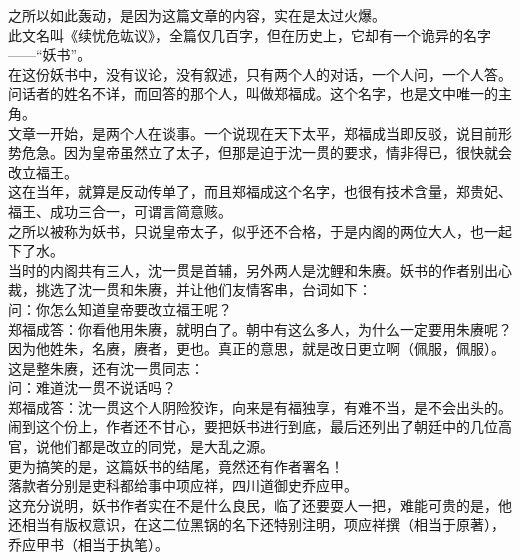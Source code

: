 \begin{multicols}{\theparacolNo}
之所以如此轰动，是因为这篇文章的内容，实在是太过火爆。\\

此文名叫《续忧危竑议》，全篇仅几百字，但在历史上，它却有一个诡异的名字——“妖书”。\\

在这份妖书中，没有议论，没有叙述，只有两个人的对话，一个人问，一个人答。问话者的姓名不详，而回答的那个人，叫做郑福成。这个名字，也是文中唯一的主角。\\

文章一开始，是两个人在谈事。一个说现在天下太平，郑福成当即反驳，说目前形势危急。因为皇帝虽然立了太子，但那是迫于沈一贯的要求，情非得已，很快就会改立福王。\\

这在当年，就算是反动传单了，而且郑福成这个名字，也很有技术含量，郑贵妃、福王、成功三合一，可谓言简意赅。\\

之所以被称为妖书，只说皇帝太子，似乎还不合格，于是内阁的两位大人，也一起下了水。\\

当时的内阁共有三人，沈一贯是首辅，另外两人是沈鲤和朱赓。妖书的作者别出心裁，挑选了沈一贯和朱赓，并让他们友情客串，台词如下：\\

问：你怎么知道皇帝要改立福王呢？\\

郑福成答：你看他用朱赓，就明白了。朝中有这么多人，为什么一定要用朱赓呢？因为他姓朱，名赓，赓者，更也。真正的意思，就是改日更立啊（佩服，佩服）。\\

这是整朱赓，还有沈一贯同志：\\

问：难道沈一贯不说话吗？\\

郑福成答：沈一贯这个人阴险狡诈，向来是有福独享，有难不当，是不会出头的。\\

闹到这个份上，作者还不甘心，要把妖书进行到底，最后还列出了朝廷中的几位高官，说他们都是改立的同党，是大乱之源。\\

更为搞笑的是，这篇妖书的结尾，竟然还有作者署名！\\

落款者分别是吏科都给事中项应祥，四川道御史乔应甲。\\

这充分说明，妖书作者实在不是什么良民，临了还要耍人一把，难能可贵的是，他还相当有版权意识，在这二位黑锅的名下还特别注明，项应祥撰（相当于原著），乔应甲书（相当于执笔）。\\


\end{multicols}
